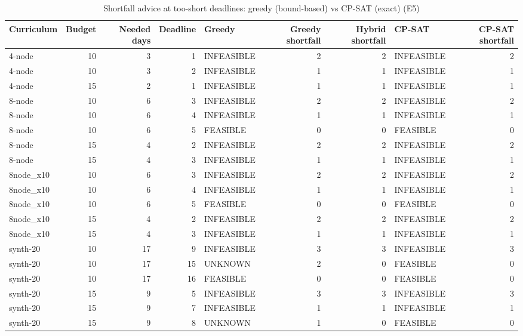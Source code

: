 \begin{table}[htbp]
\centering\small
\caption{Shortfall advice at too-short deadlines: greedy (bound-based) vs CP-SAT (exact) (E5)}
\label{tab:t2}
\begin{tabular}{lrrrlrrlr}
\toprule
Curriculum & Budget & Needed days & Deadline & Greedy & Greedy shortfall & Hybrid shortfall & CP-SAT & CP-SAT shortfall \\
\midrule
4-node & 10 & 3 & 1 & INFEASIBLE & 2 & 2 & INFEASIBLE & 2 \\
4-node & 10 & 3 & 2 & INFEASIBLE & 1 & 1 & INFEASIBLE & 1 \\
4-node & 15 & 2 & 1 & INFEASIBLE & 1 & 1 & INFEASIBLE & 1 \\
8-node & 10 & 6 & 3 & INFEASIBLE & 2 & 2 & INFEASIBLE & 2 \\
8-node & 10 & 6 & 4 & INFEASIBLE & 1 & 1 & INFEASIBLE & 1 \\
8-node & 10 & 6 & 5 & FEASIBLE & 0 & 0 & FEASIBLE & 0 \\
8-node & 15 & 4 & 2 & INFEASIBLE & 2 & 2 & INFEASIBLE & 2 \\
8-node & 15 & 4 & 3 & INFEASIBLE & 1 & 1 & INFEASIBLE & 1 \\
8node\_x10 & 10 & 6 & 3 & INFEASIBLE & 2 & 2 & INFEASIBLE & 2 \\
8node\_x10 & 10 & 6 & 4 & INFEASIBLE & 1 & 1 & INFEASIBLE & 1 \\
8node\_x10 & 10 & 6 & 5 & FEASIBLE & 0 & 0 & FEASIBLE & 0 \\
8node\_x10 & 15 & 4 & 2 & INFEASIBLE & 2 & 2 & INFEASIBLE & 2 \\
8node\_x10 & 15 & 4 & 3 & INFEASIBLE & 1 & 1 & INFEASIBLE & 1 \\
synth-20 & 10 & 17 & 9 & INFEASIBLE & 3 & 3 & INFEASIBLE & 3 \\
synth-20 & 10 & 17 & 15 & UNKNOWN & 2 & 0 & FEASIBLE & 0 \\
synth-20 & 10 & 17 & 16 & FEASIBLE & 0 & 0 & FEASIBLE & 0 \\
synth-20 & 15 & 9 & 5 & INFEASIBLE & 3 & 3 & INFEASIBLE & 3 \\
synth-20 & 15 & 9 & 7 & INFEASIBLE & 1 & 1 & INFEASIBLE & 1 \\
synth-20 & 15 & 9 & 8 & UNKNOWN & 1 & 0 & FEASIBLE & 0 \\
\bottomrule
\end{tabular}
\end{table}
